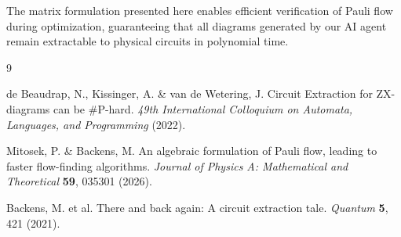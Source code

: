 \documentclass{article}
\begin{document}
The matrix formulation presented here enables efficient verification of Pauli flow during optimization, guaranteeing that all diagrams generated by our AI agent remain extractable to physical circuits in polynomial time.

\begin{thebibliography}{9}

de Beaudrap, N., Kissinger, A. \& van de Wetering, J.
Circuit Extraction for ZX-diagrams can be \#P-hard.
\textit{49th International Colloquium on Automata, Languages, and Programming} (2022).

Mitosek, P. \& Backens, M.
An algebraic formulation of Pauli flow, leading to faster flow-finding algorithms.
\textit{Journal of Physics A: Mathematical and Theoretical} \textbf{59}, 035301 (2026).

Backens, M. et al.
There and back again: A circuit extraction tale.
\textit{Quantum} \textbf{5}, 421 (2021).

\end{thebibliography}
\end{document}
